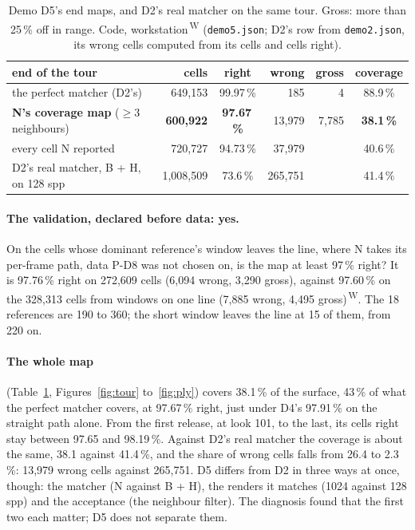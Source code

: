 \documentclass[11pt,a4paper]{article}
\newcommand{\code}[1]{\texttt{\small #1}}
\newcommand{\src}[1]{\textsuperscript{\,#1}}
\newcommand{\WS}{\src{W}}   %
\begin{document}
\begin{table}[h]
\centering\small
\begin{tabular}{@{}lrcrrc@{}}
\toprule
end of the tour & cells & right & wrong & gross & coverage\\
\midrule
the perfect matcher (D2's) & 649,153 & 99.97\,\% & 185 & 4 & 88.9\,\%\\
\textbf{N's coverage map} ($\ge3$ neighbours) & \textbf{600,922} & \textbf{97.67\,\%} & 13,979 & 7,785 & \textbf{38.1\,\%}\\
every cell N reported & 720,727 & 94.73\,\% & 37,979 & & 40.6\,\%\\
\midrule
D2's real matcher, B + H, on 128 spp & 1,008,509 & 73.6\,\% & 265,751 & & 41.4\,\%\\
\bottomrule
\end{tabular}
\caption{Demo D5's end maps, and D2's real matcher on the same tour. Gross: more than 25\,\% off in range. Code,
workstation\WS{} (\code{demo5.json}; D2's row from \code{demo2.json}, its wrong cells computed from its cells and cells
right).}\label{tab:d5}
\end{table}

\paragraph{The validation, declared before data: yes.} On the cells whose dominant reference's window leaves the line,
where N takes its per-frame path, data P-D8 was not chosen on, is the map at least 97\,\% right? It is 97.76\,\% right on
272,609 cells (6,094 wrong, 3,290 gross), against 97.60\,\% on the 328,313 cells from windows on one line (7,885 wrong,
4,495 gross)\WS. The 18 references are 190 to 360; the short window leaves the line at 15 of them, from 220 on.

\paragraph{The whole map} (Table~\ref{tab:d5}, Figures~\ref{fig:tour} to~\ref{fig:ply}) covers 38.1\,\% of the surface,
43\,\% of what the perfect matcher covers, at 97.67\,\% right, just under D4's 97.91\,\% on the straight path alone. From
the first release, at look 101, to the last, its cells right stay between 97.65 and 98.19\,\%. Against D2's real matcher
the coverage is about the same, 38.1 against 41.4\,\%, and the share of wrong cells falls from 26.4 to 2.3\,\%: 13,979
wrong cells against 265,751. D5 differs from D2 in three ways at once, though: the matcher (N against B + H), the renders
it matches (1024 against 128 spp) and the acceptance (the neighbour filter). The diagnosis found that the first two each
matter; D5 does not separate them.
\end{document}
